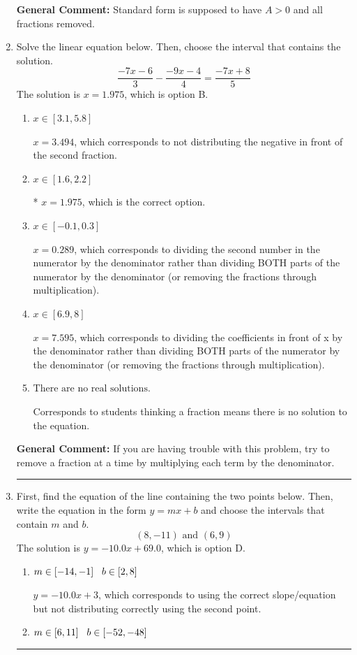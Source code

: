 \documentclass{extbook}[14pt]
\newcommand{\litem}[1]{\item #1

\rule{\textwidth}{0.4pt}}
\begin{document}
\begin{enumerate}
{\textbf{General Comment:} Standard form is supposed to have $A > 0$ and all fractions removed.
}
\litem{
Solve the linear equation below. Then, choose the interval that contains the solution.
\[ \frac{-7x -6}{3} - \frac{-9x -4}{4} = \frac{-7x + 8}{5} \]The solution is \( x = 1.975 \), which is option B.\begin{enumerate}[label=\Alph*.]
\item \( x \in [3.1, 5.8] \)

 $x = 3.494$, which corresponds to not distributing the negative in front of the second fraction.
\item \( x \in [1.6, 2.2] \)

* $x = 1.975$, which is the correct option.
\item \( x \in [-0.1, 0.3] \)

 $x = 0.289$, which corresponds to dividing the second number in the numerator by the denominator rather than dividing BOTH parts of the numerator by the denominator (or removing the fractions through multiplication).
\item \( x \in [6.9, 8] \)

 $x = 7.595$, which corresponds to dividing the coefficients in front of x by the denominator rather than dividing BOTH parts of the numerator by the denominator (or removing the fractions through multiplication).
\item \( \text{There are no real solutions.} \)

Corresponds to students thinking a fraction means there is no solution to the equation.
\end{enumerate}

\textbf{General Comment:} If you are having trouble with this problem, try to remove a fraction at a time by multiplying each term by the denominator.
}
\litem{
First, find the equation of the line containing the two points below. Then, write the equation in the form $ y=mx+b $ and choose the intervals that contain $m$ and $b$.
\[ (8, -11) \text{ and } (6, 9) \]The solution is \( y = -10.0x + 69.0 \), which is option D.\begin{enumerate}[label=\Alph*.]
\item \( m \in [-14, -1] \hspace*{3mm} b \in [2, 8] \)

 $y = -10.0x + 3$, which corresponds to using the correct slope/equation but not distributing correctly using the second point.
\item \( m \in [6, 11] \hspace*{3mm} b \in [-52, -48] \)


\end{enumerate}}
\end{enumerate}
\end{document}
